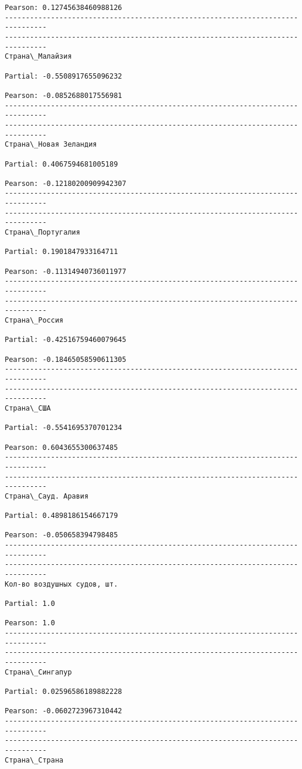 \documentclass[11pt,mathletters]{article}
\begin{document}
\begin{Verbatim}[commandchars=\\\{\}]
Pearson: 0.12745638460988126
--------------------------------------------------------------------------------
--------------------------------------------------------------------------------
Страна\_Малайзия

Partial: -0.5508917655096232

Pearson: -0.0852688017556981
--------------------------------------------------------------------------------
--------------------------------------------------------------------------------
Страна\_Новая Зеландия 

Partial: 0.4067594681005189

Pearson: -0.12180200909942307
--------------------------------------------------------------------------------
--------------------------------------------------------------------------------
Страна\_Португалия

Partial: 0.1901847933164711

Pearson: -0.11314940736011977
--------------------------------------------------------------------------------
--------------------------------------------------------------------------------
Страна\_Россия

Partial: -0.42516759460079645

Pearson: -0.18465058590611305
--------------------------------------------------------------------------------
--------------------------------------------------------------------------------
Страна\_США

Partial: -0.5541695370701234

Pearson: 0.6043655300637485
--------------------------------------------------------------------------------
--------------------------------------------------------------------------------
Страна\_Сауд. Аравия

Partial: 0.4898186154667179

Pearson: -0.050658394798485
--------------------------------------------------------------------------------
--------------------------------------------------------------------------------
Кол-во воздушных судов, шт. 

Partial: 1.0

Pearson: 1.0
--------------------------------------------------------------------------------
--------------------------------------------------------------------------------
Страна\_Сингапур

Partial: 0.02596586189882228

Pearson: -0.0602723967310442
--------------------------------------------------------------------------------
--------------------------------------------------------------------------------
Страна\_Страна


\end{Verbatim}
\end{document}
